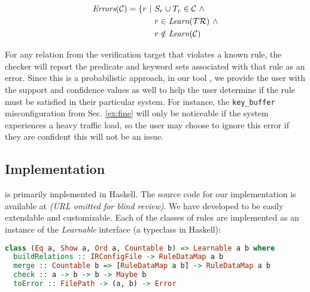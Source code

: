 \begin{align*}
\textit{Errors}(\mathcal{C}) = \{ r\ |\ & S_r \cup T_r \in \mathcal{C} \ \land \\
                               & r \in \textit{Learn}(\mathcal{TR}) \ \land \\
                               & r \notin \textit{Learn}(\mathcal{C})
\end{align*}

For any relation from the verification target that violates a known rule, the checker will report the predicate and keyword sets associated with that rule as an error.
Since this is a probabilistic approach, in our tool \app, we provide the user with the support and confidence values as well to help the user determine if the rule must be satisfied in their particular system.
For instance, the \texttt{key\_buffer} misconfiguration from Sec. \ref{ex:fine} will only be noticeable if the system experiences a heavy traffic load, so the user may choose to ignore this error if they are confident this will not be an issue.

\iffalse
\subsection{Implementation}

\app is primarily implemented in Haskell.
The source code for our implementation is available at {\em (URL omitted for blind review)}.
We have developed \app to be easily extendable and customizable. Each of the classes of rules are implemented as an instance of the \textit{Learnable} interface (a typeclass in Haskell):

\begin{lstlisting}[language=Haskell, xleftmargin=.01\textwidth]
class (Eq a, Show a, Ord a, Countable b) => Learnable a b where
  buildRelations :: IRConfigFile -> RuleDataMap a b
  merge :: Countable b => [RuleDataMap a b] -> RuleDataMap a b
  check :: a -> b -> b -> Maybe b
  toError :: FilePath -> (a, b) -> Error
\end{lstlisting} 

